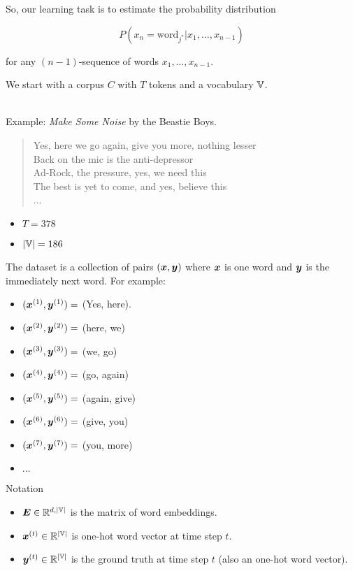 So, our learning task is to estimate the probability distribution 

\[
P(x_{n} = \text{word}_{j^{*}} | x_{1}, \dots ,x_{n-1})
\]

for any $(n-1)$-sequence of words $x_{1}, \dots ,x_{n-1}$.

We start with a corpus $C$ with $T$ tokens and a vocabulary $\mathbb{V}$.\\\

Example: \textit{Make Some Noise} by the Beastie Boys.\\

\begin{quote}
Yes, here we go again, give you more, nothing lesser\\
Back on the mic is the anti-depressor\\
Ad-Rock, the pressure, yes, we need this\\
The best is yet to come, and yes, believe this\\
... \\
\end{quote}

\begin{itemize}
\item $T = 378$
\item $|\mathbb{V}| = 186$
\end{itemize}


The dataset is a collection of pairs $(\bm{x},\bm{y})$ where $\bm{x}$ is one word and $\bm{y}$ is the immediately next word. For example:
\begin{itemize}
\item [] $(\bm{x}^{(1)}, \bm{y}^{(1)}) =$ (Yes, here).
\item [] $(\bm{x}^{(2)}, \bm{y}^{(2)}) =$ (here, we)
\item [] $(\bm{x}^{(3)}, \bm{y}^{(3)}) =$ (we, go)
\item [] $(\bm{x}^{(4)}, \bm{y}^{(4)}) =$ (go, again)
\item [] $(\bm{x}^{(5)}, \bm{y}^{(5)}) =$ (again, give)
\item [] $(\bm{x}^{(6)}, \bm{y}^{(6)}) =$ (give, you)
\item [] $(\bm{x}^{(7)}, \bm{y}^{(7)}) =$ (you, more)
\item [] $\dots$
\end{itemize}

Notation

\begin{itemize}
\item $\bm{E} \in \mathbb{R}^{d,|\mathbb{V}|}$ is the matrix of word embeddings.
\vspace{0.3cm}
\item $\bm{x}^{(t)} \in \mathbb{R}^{|\mathbb{V}|}$ is one-hot word vector at time step $t$.
\vspace{0.3cm}
\item $\bm{y}^{(t)} \in \mathbb{R}^{|\mathbb{V}|}$ is the ground truth at time step $t$ (also an one-hot word vector).
\end{itemize}

